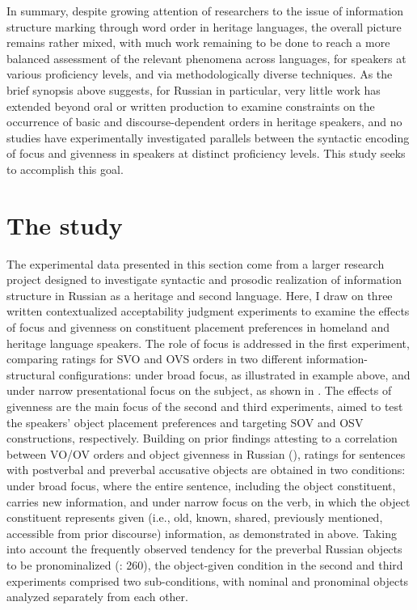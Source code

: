 \documentclass[output=paper]{langscibook}
\begin{document}
In summary, despite growing attention of researchers to the issue of information structure marking through word order in heritage languages, the overall picture remains rather mixed, with much work remaining to be done to reach a more balanced assessment of the relevant phenomena across languages, for speakers at various proficiency levels, and via methodologically diverse techniques. As the brief synopsis above suggests, for Russian in particular, very little work has extended beyond oral or written production to examine constraints on the occurrence of basic and discourse-dependent orders in heritage speakers, and no studies have experimentally investigated parallels between the syntactic encoding of focus and givenness in speakers at distinct proficiency levels. This study seeks to accomplish this goal.

\section{The study}\label{sec:laleko:4}

The experimental data presented in this section come from a larger research project designed to investigate syntactic and prosodic realization of information structure in Russian as a heritage and second language. Here, I draw on three written contextualized acceptability judgment experiments to examine the effects of focus and givenness on constituent placement preferences in homeland and heritage language speakers. The role of focus is addressed in the first experiment, comparing ratings for SVO and OVS orders in two different information-structural configurations: under broad focus, as illustrated in example  above, and under narrow presentational focus on the subject, as shown in . The effects of givenness are the main focus of the second and third experiments, aimed to test the speakers’ object placement preferences and targeting SOV and OSV constructions, respectively. Building on prior findings attesting to a correlation between VO/OV orders and object givenness in Russian (\citealt{Sirotinina1965, Slioussar2007}), ratings for sentences with postverbal and preverbal accusative objects are obtained in two conditions: under broad focus, where the entire sentence, including the object constituent, carries new information, and under narrow focus on the verb, in which the object constituent represents given (i.e., old, known, shared, previously mentioned, accessible from prior discourse) information, as demonstrated in  above. Taking into account the frequently observed tendency for the preverbal Russian objects to be pronominalized (\citealt{MillerWeinert1998}: 260), the object-given condition in the second and third experiments comprised two sub-conditions, with nominal and pronominal objects analyzed separately from each other.
\end{document}
